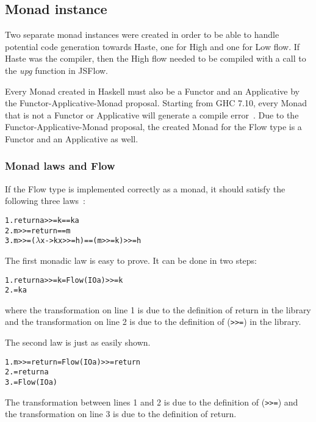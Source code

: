 \subsection{Monad instance}
Two separate monad instances were created in order to be able to handle potential code generation towards Haste, one for High and one for Low flow. If Haste was the compiler, then the High flow needed to be compiled with a call to the \emph{upg} function in JSFlow.

Every Monad created in Haskell must also be a Functor and an Applicative by the Functor-Applicative-Monad proposal. Starting from GHC 7.10, every Monad that is not a Functor or Applicative will generate a compile error~\cite{functor_applicative_monad}. Due to the Functor-Applicative-Monad proposal, the created Monad for the Flow type is a Functor and an Applicative as well.
\subsubsection{Monad laws and Flow}
\label{chapter:monad-laws}
If the Flow type is implemented correctly as a monad, it should satisfy the following three laws~\cite{functor-monad-law}:
\begin{alltt}
  1.  return a >>= k  ==  k a
  2.  m >>= return  ==  m
  3.  m >>= (\(\lambda\)x -> k x >>= h)  ==  (m >>= k) >>= h
\end{alltt}
The first monadic law is easy to prove. It can be done in two steps:
\begin{alltt}
  1. return a >>= k = Flow (IO a) >>= k
  2.                = k a
\end{alltt}
where the transformation on line 1 is due to the definition of return in the library and the transformation on line 2 is due to the definition of ({\tt >>=}) in the library.

The second law is just as easily shown.
\begin{alltt}
  1. m >>= return = Flow (IO a) >>= return
  2.              = return a
  3.              = Flow (IO a)
\end{alltt}
The transformation between lines 1 and 2 is due to the definition of ({\tt >>=}) and the transformation on line 3 is due to the definition of return.

